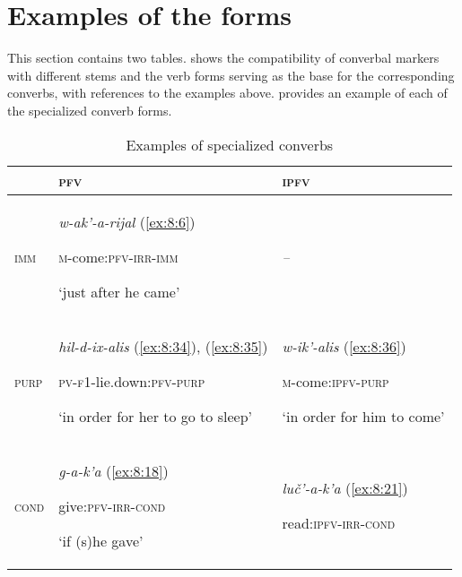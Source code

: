 ﻿\documentclass[output=paper]{langsci/langscibook}
\begin{document}
\section{Examples of the forms}\label{examples-of-the-forms}

This section contains two tables.  shows the compatibility of
converbal markers with different stems and the verb forms serving as the
base for the corresponding converbs, with references to the examples
above.  provides an example of each of the specialized converb
forms.


\vspace{-2\baselineskip}
\largerpage



\begin{table}[b]

  \caption{Examples of specialized converbs}\label{tab:8:2}

  \small
  \renewcommand\arraystretch{.9} %
  \begin{tabular}{@{}lp{}<{\raggedright}p{}<{\raggedright}@{}}
\toprule
& \textsc{pfv} & \textsc{ipfv}\tabularnewline  \midrule %
\textsc{imm} & \emph{w-ak'-a-rijal} (\ref{ex:8:6})

\textsc{m}-come:\textsc{pfv}-\textsc{irr}-\textsc{imm}

`just after he came' & \emph{--}\tabularnewline
\textsc{purp} & \emph{hil-d-ix-alis} (\ref{ex:8:34}), (\ref{ex:8:35})

\textsc{pv}-\textsc{f1}-lie.down:\textsc{pfv}-\textsc{purp}

`in order for her to go to sleep' & \emph{w-ik'-alis} (\ref{ex:8:36})

\textsc{m}-come:\textsc{ipfv}-\textsc{purp}

`in order for him to come'\tabularnewline
\textsc{cond} & \emph{g-a-k'a} (\ref{ex:8:18})

give:\textsc{pfv}-\textsc{irr}-\textsc{cond}

`if (s)he gave' & \emph{luč'-a-k'a} (\ref{ex:8:21})

read:\textsc{ipfv}-\textsc{irr}-\textsc{cond}


\end{tabular}
\end{table}
\end{document}
